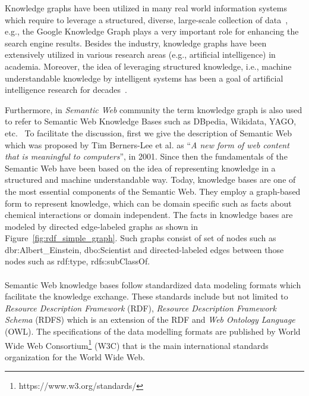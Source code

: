 Knowledge graphs have been utilized in many real world information systems which require to leverage a structured, diverse, large-scale collection of data~\cite{DBLP:journals/semweb/Paulheim17,hogan2020knowledge}, e.g., the Google Knowledge Graph plays a very important role for enhancing the search engine results.  Besides the industry, knowledge graphs have been extensively utilized in various research areas (e.g., artificial intelligence) in academia. Moreover, the idea of leveraging structured knowledge, i.e., machine understandable knowledge by intelligent systems has been a goal of artificial intelligence research for decades~\cite{DBLP:journals/semweb/Paulheim17}. %

Furthermore, in \textit{Semantic Web} community the term knowledge graph is also used to refer to Semantic Web Knowledge Bases such as DBpedia, Wikidata, YAGO, etc.~\cite{DBLP:journals/semweb/Paulheim17} To facilitate the discussion, first we give the description of Semantic Web which was proposed by Tim Berners-Lee et al. as ``\textit{A new form of web content that is meaningful to computers}'', in 2001. Since then the fundamentals of the Semantic Web have been based on the idea of representing knowledge in a structured and machine understandable way. Today, knowledge bases are one of the most essential components of the Semantic Web.
They employ a graph-based form to represent knowledge, which can be domain specific such as facts about chemical interactions or domain independent. The facts in knowledge bases are modeled by directed edge-labeled graphs as shown in Figure~\ref{fig:rdf_simple_graph}. Such graphs consist of set of nodes such as \textsf{dbr:Albert\_Einstein, dbo:Scientist} and directed-labeled edges between those nodes such as \textsf{rdf:type, rdfs:subClassOf}. 
\\\\


Semantic Web knowledge bases follow standardized data modeling formats which facilitate the knowledge exchange. These standards include but not limited to \textit{Resource Description Framework} (RDF),  \textit{Resource Description Framework Schema} (RDFS) which is an extension of the RDF and \textit{Web Ontology Language} (OWL). The specifications of the data modelling formats are published by World Wide Web Consortium\footnote{https://www.w3.org/standards/} (W3C) that is the main international standards organization for the World Wide Web.%

